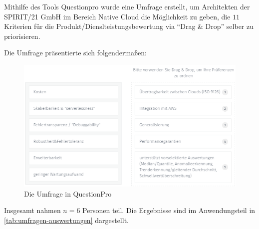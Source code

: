 \label{anhang:umfrage}
Mithilfe des Tools Questionpro wurde eine Umfrage erstellt, um Architekten der SPIRIT/21 GmbH im Bereich Native Cloud die Möglichkeit zu geben, die $11$ Kriterien für die Produkt/Dienslteistungsbewertung via \enquote{Drag \& Drop} selber zu priorisieren.

Die Umfrage präsentierte sich folgendermaßen:

\begin{figure}[H]
\centering
\includegraphics[width=\textwidth]{graphics/Umfrage-Darstellung.png}
\caption{Die Umfrage in QuestionPro}
\label{abb:Umfrage}
\end{figure}

Insgesamt nahmen $n = 6$ Personen teil. Die Ergebnisse sind im Anwendungsteil in \autoref{tab:umfragen-auswertungen} dargestellt.